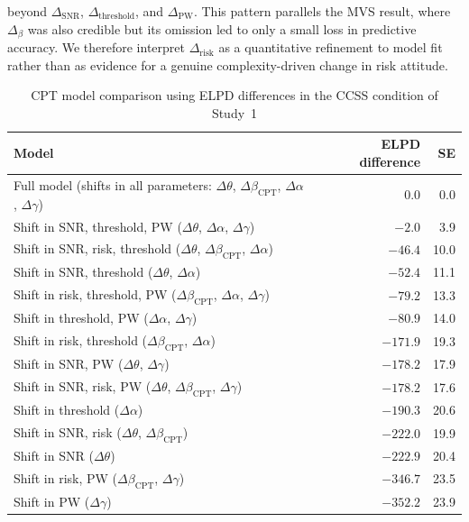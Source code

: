 \documentclass[man,floatsintext]{apa7}
\begin{document}
beyond $\Delta_{\text{SNR}}$, $\Delta_{\text{threshold}}$, and $\Delta_{\text{PW}}$. This pattern parallels the MVS result, where $\Delta_\beta$ was also credible but its omission led to only a small loss in predictive accuracy. We therefore interpret $\Delta_{\text{risk}}$ as a quantitative refinement to model fit rather than as evidence for a genuine complexity-driven change in risk attitude.

\begin{table}[!htbp]
\centering
\begin{threeparttable}\small
\caption{CPT model comparison using ELPD differences in the CCSS condition of Study~1}
\label{tab:cpt_mc_ccss_study1}
\begin{tabularx}{\linewidth}{@{} >{\raggedright\arraybackslash}X rr @{}}
\toprule
\textbf{Model} & \textbf{ELPD difference} & \textbf{SE} \\
\midrule
Full model (shifts in all parameters: $\Delta\theta$, $\Delta\beta_{\text{CPT}}$, $\Delta\alpha$, $\Delta\gamma$) & 0.0 & 0.0 \\
Shift in SNR, threshold, PW ($\Delta\theta$, $\Delta\alpha$, $\Delta\gamma$) & $-2.0$ & 3.9 \\
Shift in SNR, risk, threshold ($\Delta\theta$, $\Delta\beta_{\text{CPT}}$, $\Delta\alpha$) & $-46.4$ & 10.0 \\
Shift in SNR, threshold ($\Delta\theta$, $\Delta\alpha$) & $-52.4$ & 11.1 \\
Shift in risk, threshold, PW ($\Delta\beta_{\text{CPT}}$, $\Delta\alpha$, $\Delta\gamma$) & $-79.2$ & 13.3 \\
Shift in threshold, PW ($\Delta\alpha$, $\Delta\gamma$) & $-80.9$ & 14.0 \\
Shift in risk, threshold ($\Delta\beta_{\text{CPT}}$, $\Delta\alpha$) & $-171.9$ & 19.3 \\
Shift in SNR, PW ($\Delta\theta$, $\Delta\gamma$) & $-178.2$ & 17.9 \\
Shift in SNR, risk, PW ($\Delta\theta$, $\Delta\beta_{\text{CPT}}$, $\Delta\gamma$) & $-178.2$ & 17.6 \\
Shift in threshold ($\Delta\alpha$) & $-190.3$ & 20.6 \\
Shift in SNR, risk ($\Delta\theta$, $\Delta\beta_{\text{CPT}}$) & $-222.0$ & 19.9 \\
Shift in SNR ($\Delta\theta$) & $-222.9$ & 20.4 \\
Shift in risk, PW ($\Delta\beta_{\text{CPT}}$, $\Delta\gamma$) & $-346.7$ & 23.5 \\
Shift in PW ($\Delta\gamma$) & $-352.2$ & 23.9 \\

\end{tabularx}
\end{threeparttable}
\end{table}
\end{document}
